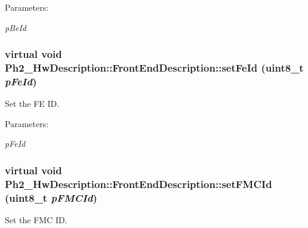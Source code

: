 \begin{Desc}
\item[Parameters:]
\begin{description}
\item[{\em p\-Be\-Id}]\end{description}
\end{Desc}
\hypertarget{class_ph2___hw_description_1_1_front_end_description_99950602e14a271cf1e2fc71be4d9e91}{
\subsubsection[setFeId]{\setlength{\rightskip}{0pt plus 5cm}virtual void Ph2\_\-Hw\-Description::Front\-End\-Description::set\-Fe\-Id (uint8\_\-t {\em p\-Fe\-Id})}}
\label{class_ph2___hw_description_1_1_front_end_description_99950602e14a271cf1e2fc71be4d9e91}


Set the FE ID. 

\begin{Desc}
\item[Parameters:]
\begin{description}
\item[{\em p\-Fe\-Id}]\end{description}
\end{Desc}
\hypertarget{class_ph2___hw_description_1_1_front_end_description_de9e6abc89ff5c5477584cc58b7c04b2}{
\subsubsection[setFMCId]{\setlength{\rightskip}{0pt plus 5cm}virtual void Ph2\_\-Hw\-Description::Front\-End\-Description::set\-FMCId (uint8\_\-t {\em p\-FMCId})}}
\label{class_ph2___hw_description_1_1_front_end_description_de9e6abc89ff5c5477584cc58b7c04b2}


Set the FMC ID. 

